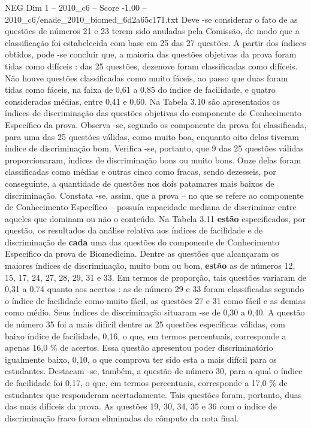 \begin{textsample}{NEG Dim 1 – 2010\_c6 – Score -1.00 – 2010\_c6/enade\_2010\_biomed\_6d2a65c171.txt}
Deve -se considerar o fato de as questões de números 21 e 23 terem sido anuladas pela Comissão, de modo que a classificação foi estabelecida com base em 25 das 27 questões.
A partir dos índices obtidos, pode -se concluir que, a maioria das questões objetivas da prova foram tidas como difíceis : das 25 questões, dezenove foram classificadas como difíceis.
Não houve questões classificadas como muito fáceis, ao passo que duas foram tidas como fáceis, na faixa de 0,61 a 0,85 do índice de facilidade, e quatro consideradas médias, entre 0,41 e 0,60.
Na Tabela 3.10 são apresentados os índices de discriminação das questões objetivas do componente de Conhecimento Específico da prova.
Observa -se, segundo os componente da prova foi classificada, para uma das 25 questões válidas, como muito boa, enquanto oito delas tiveram índice de discriminação bom.
Verifica -se, portanto, que 9 das 25 questões válidas proporcionaram, índices de discriminação bons ou muito bons.
Onze delas foram classificadas como médias e outras cinco como fracas, sendo dezesseis, por conseguinte, a quantidade de questões nos dois patamares mais baixos de discriminação.
Constata -se, assim, que a prova – no que se refere ao componente de Conhecimento Específico – possuía capacidade mediana de discriminar entre aqueles que dominam ou não o conteúdo.
Na Tabela 3.11 \textbf{estão} especificados, por questão, os resultados da análise relativa aos índices de facilidade e de discriminação de \textbf{cada} uma das questões do componente de Conhecimento Específico da prova de Biomedicina.
Dentre as questões que alcançaram os maiores índices de discriminação, muito bom ou bom, \textbf{estão} as de números 12, 15, 17, 24, 27, 28, 29, 31 e 33.
Em termos de proporção, tais questões variaram de 0,31 a 0,74 quanto aos acertos : as de número 29 e 33 foram classificadas segundo o índice de facilidade como muito fácil, as questões 27 e 31 como fácil e as demias como médio.
Seus índices de discriminação situaram -se de 0,30 a 0,40.
A questão de número 35 foi a mais difícil dentre as 25 questões específicas válidas, com baixo índice de facilidade, 0,16, o que, em termos percentuais, corresponde a apenas 16,0 \% de acertos.
Essa questão apresentou poder discriminatório igualmente baixo, 0,10, o que comprova ter sido esta a mais difícil para os estudantes.
Destacam -se, também, a questão de número 30, para a qual o índice de facilidade foi 0,17, o que, em termos percentuais, corresponde a 17,0 \% de estudantes que responderam acertadamente.
Tais questões foram, portanto, duas das mais difíceis da prova.
As questões 19, 30, 34, 35 e 36 com o índice de discriminação fraco foram eliminadas do cômputo da nota final.

\end{textsample}
